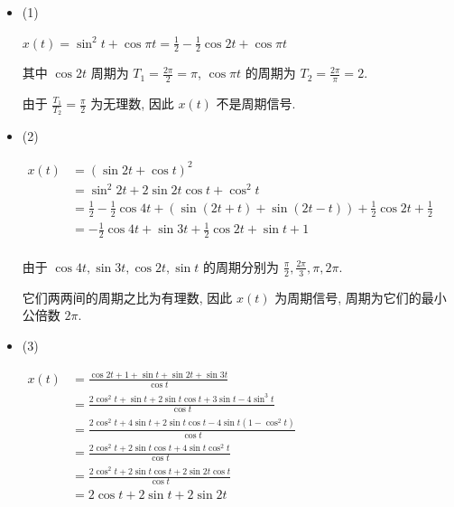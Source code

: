 \documentclass[a4paper,UTF8]{article}
\numberwithin{equation}{section}
\begin{document}
\begin{framed}
\begin{spacing}{1.5}
    \begin{itemize}
      \item (1)
      
      $\displaystyle x(t) = \sin ^{2}t + \cos \pi t = \frac{1}{2}-\frac{1}{2}\cos 2t + \cos \pi t$
      
      其中 $\cos 2t$ 周期为 $\displaystyle T_1 = \frac{2\pi}{2} = \pi$, $\cos \pi t$ 的周期为 $\displaystyle T_2 = \frac{2\pi}{\pi} = 2$.
      
      由于 $\displaystyle \frac{T_1}{T_2} = \frac{\pi}{2}$ 为无理数, 因此 $x(t)$ 不是周期信号.
      
      \item (2)
      
      $
      \begin{aligned}
      x(t) &= (\sin 2t + \cos t)^{2} \\
      &= \sin^{2} 2t + 2\sin 2t\cos t + \cos^{2} t \\
      &= \frac{1}{2}-\frac{1}{2}\cos 4t + (\sin (2t+t)+\sin (2t-t)) + \frac{1}{2}\cos 2t+\frac{1}{2} \\
      &= -\frac{1}{2}\cos 4t + \sin 3 t + \frac{1}{2}\cos 2t+\sin t+1 \\
      \end{aligned}
      $
      
      由于 $\cos 4t, \sin 3t, \cos 2t, \sin t$ 的周期分别为 $\displaystyle \frac{\pi}{2}, \frac{2\pi}{3}, \pi, 2\pi$.
      
      它们两两间的周期之比为有理数, 因此 $x(t)$ 为周期信号, 周期为它们的最小公倍数 $\displaystyle 2\pi$.
      
      \item (3)
      
      $
      \begin{aligned}
      x(t) &= \frac{\cos 2t + 1 + \sin t + \sin 2t + \sin 3t}{\cos t} \\
      &= \frac{2\cos^{2} t + \sin t + 2\sin t\cos t + 3\sin t - 4\sin^{3} t}{\cos t} \\
      &= \frac{2\cos^{2} t + 4\sin t + 2\sin t\cos t - 4\sin t(1 - \cos^{2} t)}{\cos t} \\
      &= \frac{2\cos^{2} t + 2\sin t\cos t + 4\sin t\cos^{2} t}{\cos t} \\
      &= \frac{2\cos^{2} t + 2\sin t\cos t + 2\sin 2t\cos t}{\cos t} \\
      &= 2\cos t + 2\sin t + 2\sin 2t \\
      \end{aligned}
      $
      

\end{itemize}
\end{spacing}
\end{framed}
\end{document}
